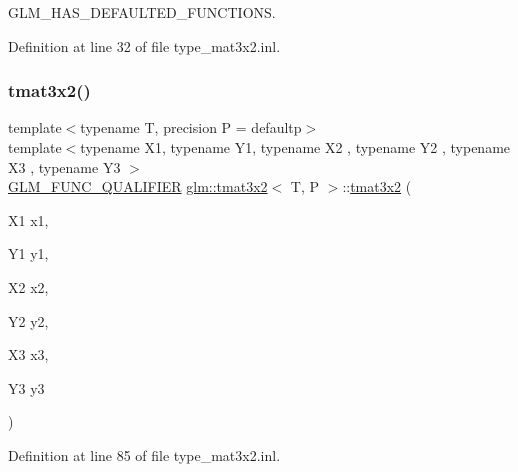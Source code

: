G\+L\+M\+\_\+\+H\+A\+S\+\_\+\+D\+E\+F\+A\+U\+L\+T\+E\+D\+\_\+\+F\+U\+N\+C\+T\+I\+O\+NS. 



Definition at line 32 of file type\+\_\+mat3x2.\+inl.

\mbox{\label{structglm_1_1tmat3x2_a52d0621ae05376523e889c01e6ad3e08}} 
\subsubsection{\texorpdfstring{tmat3x2()}{tmat3x2()}\hspace{0.1cm}{\footnotesize\ttfamily [20/22]}}
{\footnotesize\ttfamily template$<$typename T, precision P = defaultp$>$ \\
template$<$typename X1, typename Y1, typename X2 , typename Y2 , typename X3 , typename Y3 $>$ \\
\mbox{\hyperlink{setup_8hpp_a33fdea6f91c5f834105f7415e2a64407}{G\+L\+M\+\_\+\+F\+U\+N\+C\+\_\+\+Q\+U\+A\+L\+I\+F\+I\+ER}} \mbox{\hyperlink{structglm_1_1tmat3x2}{glm\+::tmat3x2}}$<$ T, P $>$\+::\mbox{\hyperlink{structglm_1_1tmat3x2}{tmat3x2}} (\begin{DoxyParamCaption}\item[{X1}]{x1,  }\item[{Y1}]{y1,  }\item[{X2}]{x2,  }\item[{Y2}]{y2,  }\item[{X3}]{x3,  }\item[{Y3}]{y3 }\end{DoxyParamCaption})}



Definition at line 85 of file type\+\_\+mat3x2.\+inl.

\mbox{\label{structglm_1_1tmat3x2_a1d369b5df9f52f6561912a6d8d4d581b}} 
